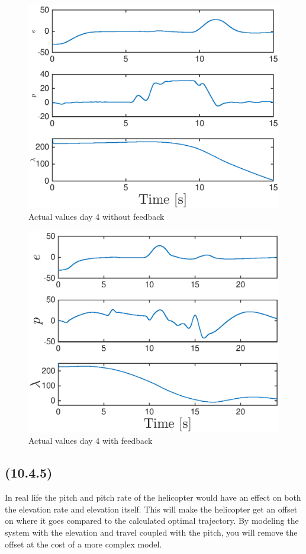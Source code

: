 \begin{figure}[H]
	\centering
	\includegraphics[width=\textwidth]{day4_nofeed}
	\caption{Actual values day 4 without feedback}
	\label{fig:day4nofeed}
\end{figure}


\begin{figure}[H]
	\centering
	\includegraphics[width=\textwidth]{day4_yesfeed}
	\caption{Actual values day 4 with feedback}
	\label{fig:day4yesfeed}
\end{figure}

\subsection{(10.4.5)}
In real life the pitch and pitch rate of the helicopter would have an effect on both the elevation rate and elevation itself. This will make the helicopter get an offset on where it goes compared to the calculated optimal trajectory.  
By modeling the system with the elevation and travel coupled with the pitch, you will remove the offset at the cost of a more complex model.